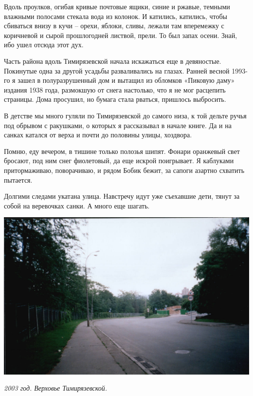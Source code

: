Вдоль проулков, огибая кривые почтовые ящики, синие и ржавые, темными влажными полосами стекала вода из колонок. И катились, катились, чтобы сбиваться внизу в кучи – орехи, яблоки, сливы, лежали там вперемежку с коричневой и сырой прошлогодней листвой, прели. То был запах осени. Знай, ибо ушел отсюда этот дух.

Часть района вдоль Тимирязевской начала искажаться еще в девяностые. Покинутые одна за другой усадьбы разваливались на глазах. Ранней весной 1993-го я зашел в полуразрушенный дом и вытащил из обломков «Пиковую даму» издания 1938 года, размокшую от снега настолько, что я не мог расцепить страницы. Дома просушил, но бумага стала рваться, пришлось выбросить.


В детстве мы много гуляли по Тимирязевской до самого низа, к той дельте ручья под обрывом с ракушками, о которых я рассказывал в начале книге. Да и на санках катался от верха и почти до половины улицы, хоздвора. 

Помню, еду вечером, в тишине только полозья шипят. Фонари оранжевый свет бросают, под ним снег фиолетовый, да еще искрой поигрывает. Я каблуками притормаживаю, поворачиваю, и рядом Бобик бежит, за сапоги азартно схватить пытается.

Долгими следами укатана улица. Навстречу идут уже съехавшие дети, тянут за собой на веревочках санки. А много еще шагать.

\begin{center}
\includegraphics[width=\linewidth]{chast-vosp/zver/out0026.jpg}

\textit{2003 год. Верховье Тимирязевской.}
\end{center}

